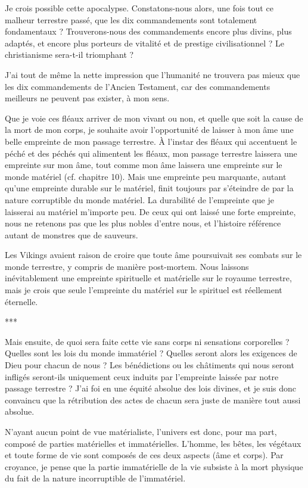 Je crois possible cette apocalypse. Constatons-nous alors, une fois tout ce malheur terrestre passé, que les dix commandements sont totalement fondamentaux ? Trouverons-nous des commandements encore plus divins, plus adaptés, et encore plus porteurs de vitalité et de prestige civilisationnel ? Le christianisme sera-t-il triomphant ?

J’ai tout de même la nette impression que l’humanité ne trouvera pas mieux que les dix commandements de l’Ancien Testament, car des commandements meilleurs ne peuvent pas exister, à mon sens.

Que je voie ces fléaux arriver de mon vivant ou non, et quelle que soit la cause de la mort de mon corps, je souhaite avoir l’opportunité de laisser à mon âme une belle empreinte de mon passage terrestre. À l’instar des fléaux qui accentuent le péché et des péchés qui alimentent les fléaux, mon passage terrestre laissera une empreinte sur mon âme, tout comme mon âme laissera une empreinte sur le monde matériel (cf. chapitre 10). Mais une empreinte peu marquante, autant qu’une empreinte durable sur le matériel, finit toujours par s’éteindre de par la nature corruptible du monde matériel. La durabilité de l’empreinte que je laisserai au matériel m’importe peu. De ceux qui ont laissé une forte empreinte, nous ne retenons pas que les plus nobles d’entre nous, et l’histoire référence autant de monstres que de sauveurs.

Les Vikings avaient raison de croire que toute âme poursuivait ses combats sur le monde terrestre, y compris de manière post-mortem. Nous laissons inévitablement une empreinte spirituelle et matérielle sur le royaume terrestre, mais je crois que seule l’empreinte du matériel sur le spirituel est réellement éternelle.

\begin{center}
***
\end{center}

Mais ensuite, de quoi sera faite cette vie sans corps ni sensations corporelles ? Quelles sont les lois du monde immatériel ? Quelles seront alors les exigences de Dieu pour chacun de nous ? Les bénédictions ou les châtiments qui nous seront infligés seront-ils uniquement ceux induits par l’empreinte laissée par notre passage terrestre ? J’ai foi en une équité absolue des lois divines, et je suis donc convaincu que la rétribution des actes de chacun sera juste de manière tout aussi absolue.

N’ayant aucun point de vue matérialiste, l’univers est donc, pour ma part, composé de parties matérielles et immatérielles. L’homme, les bêtes, les végétaux et toute forme de vie sont composés de ces deux aspects (âme et corps). Par croyance, je pense que la partie immatérielle de la vie subsiste à la mort physique du fait de la nature incorruptible de l'immatériel.


